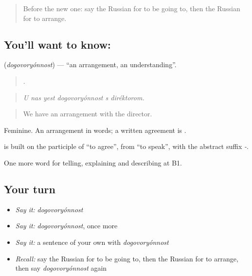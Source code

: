 \begin{quote}
Before the new one: say the Russian for to be going to, then the Russian for to arrange.
\end{quote}

\subsection*{You'll want to know: }
\textbf{} (\emph{dogovoryónnost}) — \textquotedblleft{}an arrangement, an understanding\textquotedblright{}.

\begin{quote}
     .
\end{quote}

\begin{quote}
\emph{U nas yest dogovoryónnost s diréktorom.}
\end{quote}

\begin{quote}
We have an arrangement with the director.
\end{quote}

Feminine. An arrangement in words; a written agreement is \emph{}.

\begin{cousinweb}
\textbf{} is built on the participle of \emph{} \textquotedblleft{}to agree\textquotedblright{}, from \emph{} \textquotedblleft{}to speak\textquotedblright{}, with the abstract suffix \emph{-}.
\end{cousinweb}

\begin{grammarlens}[title={What you've built}]
One more word for telling, explaining and describing at B1.
\end{grammarlens}

\subsection*{Your turn}
\begin{itemize}
\raggedright
  \item \emph{Say it:} \emph{dogovoryónnost}
  \item \emph{Say it:} \emph{dogovoryónnost}, once more
  \item \emph{Say it:} a sentence of your own with \emph{dogovoryónnost}
  \item \emph{Recall:} say the Russian for to be going to, then the Russian for to arrange, then say \emph{dogovoryónnost} again
\end{itemize}

